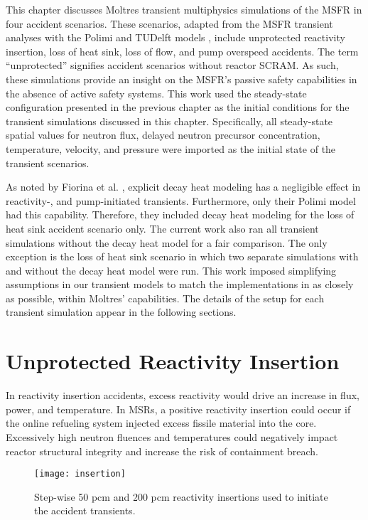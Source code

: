This chapter discusses Moltres transient multiphysics simulations of the
\gls{MSFR} in four accident scenarios. These scenarios, adapted from the
\gls{MSFR} transient analyses with the Polimi and TUDelft models
\cite{fiorina_modelling_2014}, include unprotected reactivity
insertion, loss of heat sink, loss of flow, and pump overspeed accidents. The
term ``unprotected'' signifies accident scenarios without reactor SCRAM. As
such, these simulations provide an insight on the
\gls{MSFR}'s passive safety capabilities in the absence
of active safety systems. This work used the steady-state configuration
presented in the previous chapter as the initial conditions for the transient
simulations discussed in this chapter. Specifically, all steady-state spatial
values for neutron flux, delayed neutron precursor concentration, temperature,
velocity, and pressure were imported as the initial state of the transient
scenarios.

As noted by Fiorina et al. \cite{fiorina_modelling_2014}, explicit decay heat
modeling has a negligible effect in reactivity-, and pump-initiated
transients. Furthermore, only their Polimi model had this capability.
Therefore, they included decay heat modeling for the loss of heat sink
accident scenario only. The current work also ran all transient simulations
without the decay heat model for a fair comparison. The only exception is the
loss of heat sink scenario in which two separate simulations with and without
the decay heat model were run. This work imposed simplifying assumptions in
our transient models to match the implementations in
\cite{fiorina_modelling_2014} as closely as possible, within Moltres'
capabilities. The details of the setup for each
transient simulation appear in the following sections.

\section{Unprotected Reactivity Insertion}
In reactivity insertion accidents, excess reactivity would drive an increase
in flux, power, and temperature. In
\glspl{MSR}, a positive reactivity insertion could occur if the online
refueling system injected excess fissile material into the core. Excessively
high neutron fluences and temperatures could negatively impact reactor
structural integrity and increase the risk of containment breach.

\begin{figure}[htbp!]
    \centering
    \texttt{[image: insertion]}
    \caption{Step-wise 50 pcm and 200 pcm reactivity insertions used to
    initiate the accident transients.}
    \label{fig:insertion}
\end{figure}

